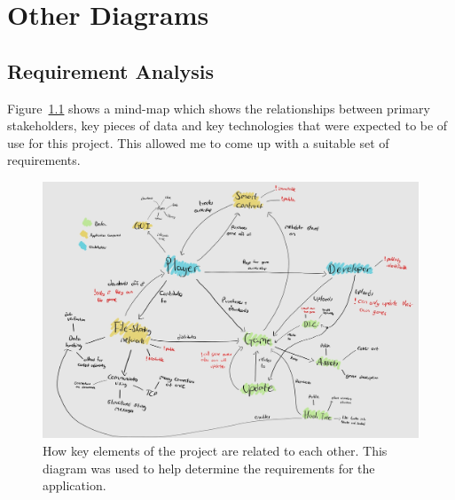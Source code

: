 \appendix




\chapter{Other Diagrams}

\section*{Requirement Analysis}\label{app:req-analysis}

Figure~\ref{fig:req-generator} shows a mind-map which shows the relationships between primary stakeholders, key pieces of data and key technologies that were expected to be of use for this project. This allowed me to come up with a suitable set of requirements.

\begin{figure}[ht]
  \centering
  \includegraphics[width=.9\textwidth]{assets/images/diagrams/requirement-generation.jpg}
  \caption{How key elements of the project are related to each other. This diagram was used to help determine the requirements for the application.}
  \label{fig:req-generator}
\end{figure}